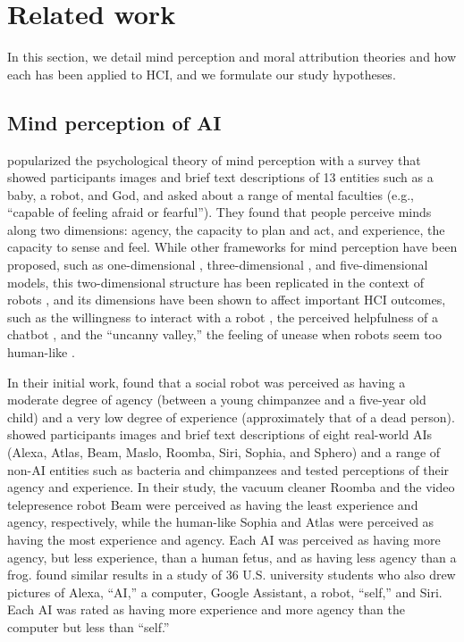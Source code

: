 \section{Related work}
In this section, we detail mind perception and moral attribution theories and how each has been applied to HCI, and we formulate our study hypotheses.

\subsection{Mind perception of AI}

\citet{gray07} popularized the psychological theory of mind perception with a survey that showed participants images and brief text descriptions of 13 entities such as a baby, a robot, and God, and asked about a range of mental faculties (e.g., “capable of feeling afraid or fearful”). They found that people perceive minds along two dimensions: agency, the capacity to plan and act, and experience, the capacity to sense and feel. While other frameworks for mind perception have been proposed, such as one-dimensional \cite{tzelios22}, three-dimensional \cite{weisman17}, and five-dimensional \cite{malle19a} models, this two-dimensional structure has been replicated in the context of robots \cite{kamide13}, and its dimensions have been shown to affect important HCI outcomes, such as the willingness to interact with a robot \cite{stafford14}, the perceived helpfulness of a chatbot \cite{lee24}, and the “uncanny valley,” the feeling of unease when robots seem too human-like \cite{gray12a}.

In their initial work, \citet{gray07} found that a social robot was perceived as having a moderate degree of agency (between a young chimpanzee and a five-year old child) and a very low degree of experience (approximately that of a dead person). \citet{jacobs22} showed participants images and brief text descriptions of eight real-world AIs (Alexa, Atlas, Beam, Maslo, Roomba, Siri, Sophia, and Sphero) and a range of non-AI entities such as bacteria and chimpanzees and tested perceptions of their agency and experience. In their study, the vacuum cleaner Roomba and the video telepresence robot Beam were perceived as having the least experience and agency, respectively, while the human-like Sophia and Atlas were perceived as having the most experience and agency. Each AI was perceived as having more agency, but less experience, than a human fetus, and as having less agency than a frog. \citet{hwang22} found similar results in a study of 36 U.S. university students who also drew pictures of Alexa, “AI,” a computer, Google Assistant, a robot, “self,” and Siri. Each AI was rated as having more experience and more agency than the computer but less than “self.”

